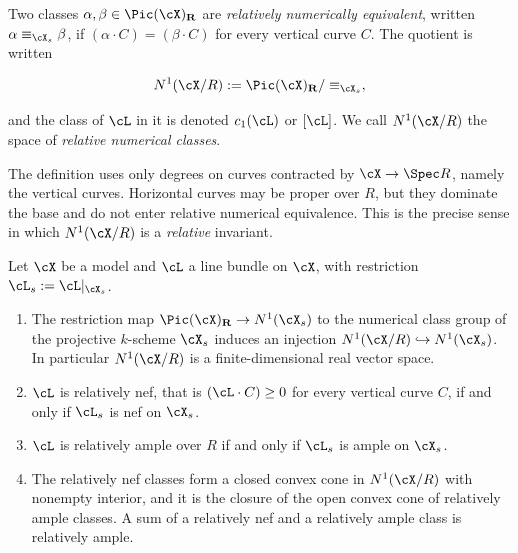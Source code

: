 \begin{definition}
\label{def:ch20-relative-numerical}
Two classes $\alpha,\beta\in\Pic(\cX)_{\mathbf R}$ are
\emph{relatively numerically equivalent}, written
$\alpha\equiv_{\cX_s}\beta$, if $(\alpha\cdot C)=(\beta\cdot C)$ for
every vertical curve $C$.  The quotient is written

\begin{equation}
\label{eq:ch20-n1-definition}
 N^1(\cX/R):=\Pic(\cX)_{\mathbf R}/\equiv_{\cX_s},
\end{equation}

and the class of $\cL$ in it is denoted $c_1(\cL)$ or
$[\cL]$.  We call $N^1(\cX/R)$ the space of \emph{relative numerical
classes}.
\end{definition}

The definition uses only degrees on curves contracted by
$\cX\to\Spec R$, namely the vertical curves.  Horizontal curves may be
proper over $R$, but they dominate the base and do not enter relative
numerical equivalence.  This is the precise sense in which
$N^1(\cX/R)$ is a \emph{relative} invariant.

\begin{lemma}
\label{lem:ch20-special-fibre-test}
Let $\cX$ be a model and $\cL$ a line bundle on $\cX$, with
restriction $\cL_s:=\cL|_{\cX_s}$.
\begin{enumerate}
\item\label{itm:ch20-sft:inject} The restriction map
 $\Pic(\cX)_{\mathbf R}\to N^1(\cX_s)$ to the numerical class group of the
 projective $k$-scheme $\cX_s$ induces an injection
 $N^1(\cX/R)\hookrightarrow N^1(\cX_s)$.  In particular
 $N^1(\cX/R)$ is a finite-dimensional real vector space.
\item\label{itm:ch20-sft:nef} $\cL$ is relatively nef, that is
 $(\cL\cdot C)\geq0$ for every vertical curve $C$, if and only if
 $\cL_s$ is nef on $\cX_s$.
\item\label{itm:ch20-sft:ample} $\cL$ is relatively ample over $R$ if
 and only if $\cL_s$ is ample on $\cX_s$.
\item\label{itm:ch20-sft:cone} The relatively nef classes form a closed
 convex cone in $N^1(\cX/R)$ with nonempty interior, and it is the closure
 of the open convex cone of relatively ample classes.  A sum of a relatively
 nef and a relatively ample class is relatively ample.
\end{enumerate}
\end{lemma}

